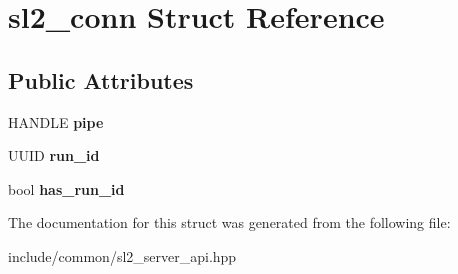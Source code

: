\hypertarget{structsl2__conn}{}\section{sl2\+\_\+conn Struct Reference}
\label{structsl2__conn}
\subsection*{Public Attributes}
\begin{DoxyCompactItemize}
\item 
\mbox{\label{structsl2__conn_ac1a1ca5aab04f1f581fd1806d707f870}} 
H\+A\+N\+D\+LE {\bfseries pipe}
\item 
\mbox{\label{structsl2__conn_a7e65aa12d1edaa85df91d681eede9462}} 
U\+U\+ID {\bfseries run\+\_\+id}
\item 
\mbox{\label{structsl2__conn_a3ed85dc7f63d14f879508150b4828699}} 
bool {\bfseries has\+\_\+run\+\_\+id}
\end{DoxyCompactItemize}


The documentation for this struct was generated from the following file\+:\begin{DoxyCompactItemize}
\item 
include/common/sl2\+\_\+server\+\_\+api.\+hpp\end{DoxyCompactItemize}
